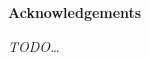 \thispagestyle{empty}

\begin{center}
  {\bf \Huge Acknowledgements}
\end{center}

\vspace{4cm}
\emph{TODO\ldots}
